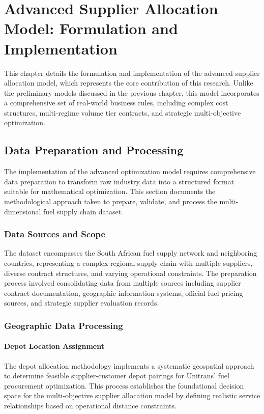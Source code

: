 
\chapter{Advanced Supplier Allocation Model: Formulation and Implementation}\label{ch:advanced}
\vspace{-2em}

This chapter details the formulation and implementation of the advanced supplier allocation model, which represents the core contribution of this research. Unlike the preliminary models discussed in the previous chapter, this model incorporates a comprehensive set of real-world business rules, including complex cost structures, multi-regime volume tier contracts, and strategic multi-objective optimization.

\section{Data Preparation and Processing}
The implementation of the advanced optimization model requires comprehensive data preparation to transform raw industry data into a structured format suitable for mathematical optimization. This section documents the methodological approach taken to prepare, validate, and process the multi-dimensional fuel supply chain dataset.

\subsection{Data Sources and Scope}
The dataset encompasses the South African fuel supply network and neighboring countries, representing a complex regional supply chain with multiple suppliers, diverse contract structures, and varying operational constraints. The preparation process involved consolidating data from multiple sources including supplier contract documentation, geographic information systems, official fuel pricing sources, and strategic supplier evaluation records.

\subsection{Geographic Data Processing}
\subsubsection{Depot Location Assignment}
The depot allocation methodology implements a systematic geospatial approach to determine feasible supplier-customer depot pairings for Unitrans' fuel procurement optimization. This process establishes the foundational decision space for the multi-objective supplier allocation model by defining realistic service relationships based on operational distance constraints.

